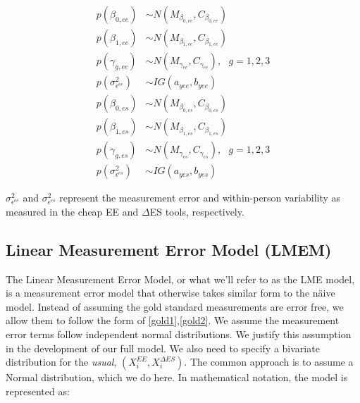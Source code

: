 \documentclass[11pt]{article}\usepackage[]{graphicx}\usepackage[]{color}
\begin{document}
\begin{multicols}{2}
\noindent 
\begin{align}
p(\beta_{0,ee}) &\sim N(M_{\beta_{0,ee}},C_{\beta_{0,ee}}) \\
p(\beta_{1,ee}) &\sim N(M_{\beta_{1,ee}},C_{\beta_{1,ee}}) \\
p(\gamma_{g,ee}) &\sim N(M_{\gamma_{ee}},C_{\gamma_{ee}}), \text{ } g=1,2,3 \\
p(\sigma^2_{\epsilon^{ee}}) &\sim IG(a_{yee},b_{yee}) 
\end{align}
\columnbreak
\begin{align}
p(\beta_{0,es}) &\sim N(M_{\beta_{0,es}},C_{\beta_{0,es}}) \\
p(\beta_{1,es}) &\sim N(M_{\beta_{1,es}},C_{\beta_{1,es}}) \\
p(\gamma_{g,es}) &\sim N(M_{\gamma_{es}},C_{\gamma_{es}}), \text{ } g=1,2,3 \\
p(\sigma^2_{\epsilon^{es}}) &\sim IG(a_{yes},b_{yes}) 
\end{align}
\end{multicols}

$\sigma^2_{\epsilon^{ee}}$ and $\sigma^2_{\epsilon^{es}}$ represent the measurement error and within-person variability as measured in the cheap EE and $\Delta$ES tools, respectively. 


\subsection{Linear Measurement Error Model (LMEM)}
The Linear Measurement Error Model, or what we'll refer to as the LME model, is a measurement error model that otherwise takes similar form to the n{\"a}ive model. Instead of assuming the gold standard measurements are error free, we allow them to follow the form of \eqref{gold1},\eqref{gold2}. We assume the measurement error terms follow independent normal distributions. We justify this assumption in the development of our full model. We also need to specify a bivariate distribution for the \emph{usual}, $(X_i^{EE},X_i^{\Delta ES})$. The common approach is to assume a Normal distribution, which we do here. In mathematical notation, the model is represented as:
\end{document}
